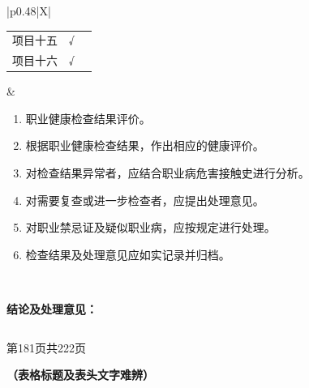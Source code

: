 \documentclass[UTF8,10pt,a4paper,fontset=fandol]{ctexart}
\newcommand{\fieldvalue}[1]{#1}
\newcommand{\handwritten}[1]{#1}
\begin{document}
\begin{tabularx}{\textwidth}{|p{0.48\textwidth}|X|}
{\begin{tabularx}{\linewidth}{@{}lXr@{}}
项目十五 &
\fieldvalue{\handwritten{√}} & \\[0.25em]
项目十六 &
\fieldvalue{\handwritten{√}} & \\
\end{tabularx}}
&
\begin{minipage}[t]{\linewidth}
\small
\begin{enumerate}
  \item 职业健康检查结果评价。
  \item 根据职业健康检查结果，作出相应的健康评价。
  \item 对检查结果异常者，应结合职业病危害接触史进行分析。
  \item 对需要复查或进一步检查者，应提出处理意见。
  \item 对职业禁忌证及疑似职业病，应按规定进行处理。
  \item 检查结果及处理意见应如实记录并归档。
\end{enumerate}
\end{minipage}
\\
\hline
\end{tabularx}

\vspace{0.5em}

\noindent
\textbf{结论及处理意见：}

\begin{tabularx}{\textwidth}{|X|}
\hline
\strut\\[2.5em]
\hline
\end{tabularx}

\vfill

\noindent
\footnotesize
第181页\quad 共222页

\newpage


\begin{center}
\textbf{（表格标题及表头文字难辨）}
\end{center}
\end{document}
